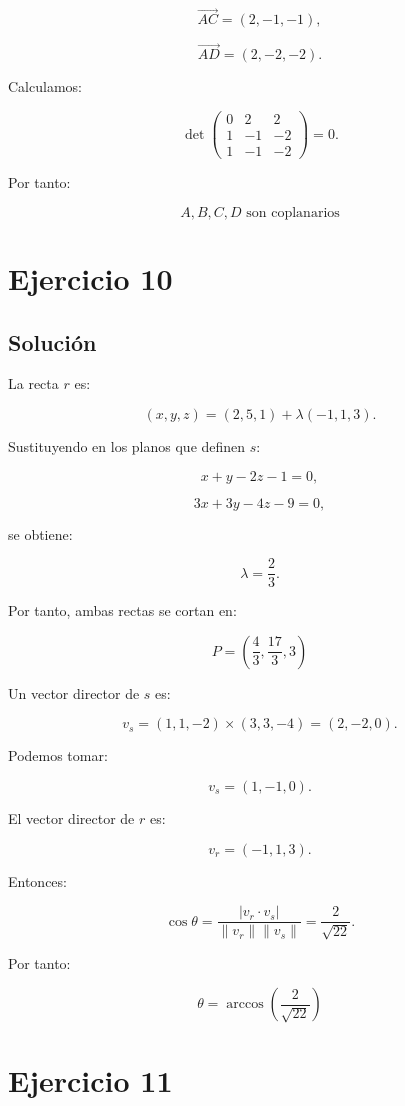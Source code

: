 \documentclass[11pt,a4paper]{article}
\begin{document}
\[
\overrightarrow{AC}=(2,-1,-1),
\]

\[
\overrightarrow{AD}=(2,-2,-2).
\]

Calculamos:

\[
\det
\begin{pmatrix}
0&2&2\\
1&-1&-2\\
1&-1&-2
\end{pmatrix}
=
0.
\]

Por tanto:

\[
\boxed{
A,B,C,D
\text{ son coplanarios}
}
\]

\section{Ejercicio 10}
\subsection{Solución}

La recta \(r\) es:

\[
(x,y,z)
=
(2,5,1)
+
\lambda(-1,1,3).
\]

Sustituyendo en los planos que definen \(s\):

\[
x+y-2z-1=0,
\]

\[
3x+3y-4z-9=0,
\]

se obtiene:

\[
\lambda=\frac23.
\]

Por tanto, ambas rectas se cortan en:

\[
\boxed{
P=
\left(
\frac43,
\frac{17}{3},
3
\right)
}
\]

Un vector director de \(s\) es:

\[
v_s
=
(1,1,-2)\times(3,3,-4)
=
(2,-2,0).
\]

Podemos tomar:

\[
v_s=(1,-1,0).
\]

El vector director de \(r\) es:

\[
v_r=(-1,1,3).
\]

Entonces:

\[
\cos\theta
=
\frac{|v_r\cdot v_s|}
{\|v_r\|\|v_s\|}
=
\frac{2}{\sqrt{22}}.
\]

Por tanto:

\[
\boxed{
\theta
=
\arccos\left(
\frac{2}{\sqrt{22}}
\right)
}
\]

\section{Ejercicio 11}
\end{document}
